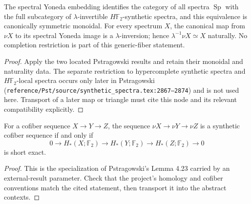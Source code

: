 \begin{theorem}
  \label{thm:external-lambda-inversion}
  \notready
  The spectral Yoneda embedding identifies the category of all spectra
  $\operatorname{Sp}$ with the full subcategory of $\lambda$-invertible
  $H\mathbb F_2$-synthetic spectra, and this equivalence is canonically
  symmetric monoidal.  For every spectrum $X$, the canonical map from $\nu X$
  to its spectral Yoneda image is a $\lambda$-inversion; hence
  $\lambda^{-1}\nu X\simeq X$ naturally.  No completion restriction is part of
  this generic-fiber statement.
\end{theorem}

\begin{proof}
  Apply the two located Pstragowski results and retain their monoidal and
  naturality data.  The separate restriction to hypercomplete synthetic
  spectra and $H\mathbb F_2$-local spectra occurs only later in Pstragowski
  (\texttt{reference/Pst/source/synthetic\_spectra.tex:2867--2874}) and is not
  used here.  Transport of a later map or triangle must cite this node and its
  relevant compatibility explicitly.
\end{proof}

\begin{theorem}
  \label{thm:external-nu-cofiber-criterion}
  \notready
  For a cofiber sequence $X\to Y\to Z$, the sequence
  $\nu X\to\nu Y\to\nu Z$ is a synthetic cofiber sequence if and only if
  \[
    0\to H_*(X;\mathbb F_2)\to H_*(Y;\mathbb F_2)
      \to H_*(Z;\mathbb F_2)\to0
  \]
  is short exact.
\end{theorem}

\begin{proof}
  This is the specialization of Pstragowski's Lemma 4.23 carried by an
  external-result parameter.  Check that the project's homology and cofiber
  conventions match the cited statement, then transport it into the abstract
  contexts.
\end{proof}

